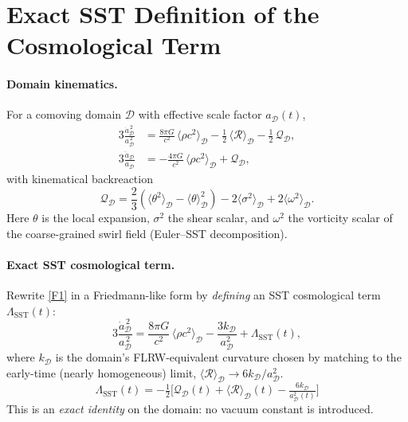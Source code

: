 \documentclass[10pt,reprint,aps,onecolumn,nofootinbib]{revtex4-2}
\newcommand{\rc}{r_c}                                    %
\providecommand{\rc}{r_c}
\newcommand{\rhoF}{\rho_{\!f}}     %
\begin{document}
    \providecommand{\rhoF}{\rho_{\!f}}
    \providecommand{\rc}{r_c}

    \section{Exact SST Definition of the Cosmological Term}
    \label{sec:SST-Lambda-exact}

    \paragraph{Domain kinematics.}
        For a comoving domain $\mathcal{D}$ with effective scale factor $a_\mathcal{D}(t)$,
        \begin{align}
        3\frac{\dot a_\mathcal{D}^{\,2}}{a_\mathcal{D}^{\,2}}
        &= \frac{8\pi G}{c^2}\,\langle \rho c^2 \rangle_\mathcal{D}
        - \tfrac{1}{2}\,\langle \mathcal{R} \rangle_\mathcal{D}
        - \tfrac{1}{2}\,\mathcal{Q}_\mathcal{D}, \tag{F1}\label{F1}\\
        3\frac{\ddot a_\mathcal{D}}{a_\mathcal{D}}
        &= -\frac{4\pi G}{c^2}\,\langle \rho c^2 \rangle_\mathcal{D}
        + \mathcal{Q}_\mathcal{D}, \tag{F2}\label{F2}
        \end{align}
        with kinematical backreaction
        \[
            \mathcal{Q}_\mathcal{D}
            = \frac{2}{3}\!\left(\langle \theta^{2}\rangle_\mathcal{D}-\langle \theta\rangle_\mathcal{D}^{2}\right)
            - 2\langle \sigma^{2}\rangle_\mathcal{D}
            + 2\langle \omega^{2}\rangle_\mathcal{D}.
        \]
        Here $\theta$ is the local expansion, $\sigma^2$ the shear scalar, and $\omega^2$ the vorticity scalar of the coarse-grained swirl field (Euler–SST decomposition).

    \paragraph{Exact SST cosmological term.}
        Rewrite \eqref{F1} in a Friedmann-like form by \emph{defining} an SST cosmological term $\Lambda_{\!\mathrm{SST}}(t)$:
        \[
            3\frac{\dot a_\mathcal{D}^{\,2}}{a_\mathcal{D}^{\,2}}
            = \frac{8\pi G}{c^2}\,\langle \rho c^2 \rangle_\mathcal{D}
            - \frac{3k_\mathcal{D}}{a_\mathcal{D}^{2}}
            + \Lambda_{\!\mathrm{SST}}(t),
        \]
        where $k_\mathcal{D}$ is the domain’s FLRW-equivalent curvature chosen by matching to the early-time (nearly homogeneous) limit, $\langle \mathcal{R} \rangle_\mathcal{D}\to 6k_\mathcal{D}/a_\mathcal{D}^2$.
        \[
            \boxed{\;
            \Lambda_{\!\mathrm{SST}}(t)
                = -\tfrac{1}{2}\Big[\mathcal{Q}_\mathcal{D}(t)
                +\langle \mathcal{R} \rangle_\mathcal{D}(t)
                - \tfrac{6k_\mathcal{D}}{a_\mathcal{D}^{2}(t)}\Big]
                \;}
            \tag{D1}\label{D1}
        \]
        This is an \emph{exact identity} on the domain: no vacuum constant is introduced.
\end{document}
